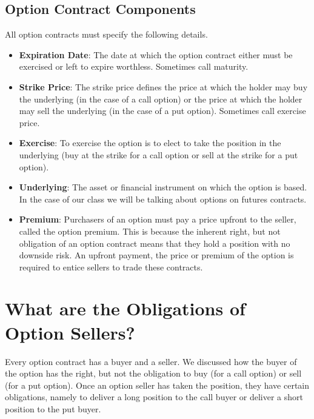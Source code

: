 \documentclass[
]{book}
\begin{document}
\hypertarget{option-contract-components}{%
\subsection{Option Contract Components}\label{option-contract-components}}

All option contracts must specify the following details.

\begin{itemize}
\item
  \textbf{Expiration Date}: The date at which the option contract either must be exercised or left to expire worthless. Sometimes call maturity.
\item
  \textbf{Strike Price}: The strike price defines the price at which the holder may buy the underlying (in the case of a call option) or the price at which the holder may sell the underlying (in the case of a put option). Sometimes call exercise price.
\item
  \textbf{Exercise}: To exercise the option is to elect to take the position in the underlying (buy at the strike for a call option or sell at the strike for a put option).
\item
  \textbf{Underlying}: The asset or financial instrument on which the option is based. In the case of our class we will be talking about options on futures contracts.
\item
  \textbf{Premium}: Purchasers of an option must pay a price upfront to the seller, called the option premium. This is because the inherent right, but not obligation of an option contract means that they hold a position with no downside risk. An upfront payment, the price or premium of the option is required to entice sellers to trade these contracts.
\end{itemize}

\hypertarget{what-are-the-obligations-of-option-sellers}{%
\section{What are the Obligations of Option Sellers?}\label{what-are-the-obligations-of-option-sellers}}

Every option contract has a buyer and a seller. We discussed how the buyer of the option has the right, but not the obligation to buy (for a call option) or sell (for a put option). Once an option seller has taken the position, they have certain obligations, namely to deliver a long position to the call buyer or deliver a short position to the put buyer.
\end{document}
